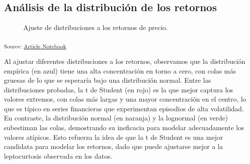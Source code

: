 \documentclass[
  number,
  preprint,
  3p,
  onecolumn]{elsarticle}
\begin{document}
\subsection{Análisis de la distribución de los
retornos}\label{sec-distribucion-retornos}

\begin{figure}[H]


\caption{\label{fig-distribution-fitting}Ajuste de distribuciones a los
retornos de precio.}

\end{figure}%

\textsubscript{Source:
\href{https://iancont.github.io/fixed_income_garch/index-preview.html}{Article
Notebook}}

Al ajustar diferentes distribuciones a los retornos, observamos que la
distribución empírica (en azul) tiene una alta concentración en torno a
cero, con colas más gruesas de lo que se esperaría bajo una distribución
normal. Entre las distribuciones probadas, la t de Student (en rojo) es
la que mejor captura los valores extremos, con colas más largas y una
mayor concentración en el centro, lo que es típico en series financieras
que experimentan episodios de alta volatilidad. En contraste, la
distribución normal (en naranja) y la lognormal (en verde) subestiman
las colas, demostrando su ineficacia para modelar adecuadamente los
valores atípicos. Esto refuerza la idea de que la t de Student es una
mejor candidata para modelar los retornos, dado que puede ajustarse
mejor a la leptocurtosis observada en los datos.
\end{document}
